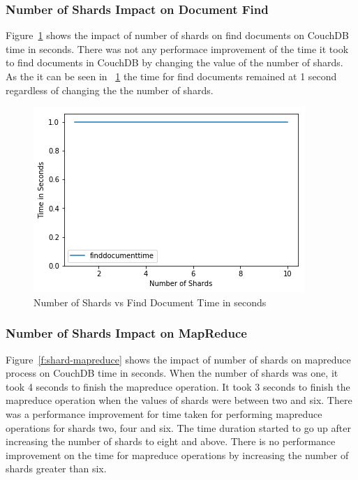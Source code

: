 \subsubsection{Number of Shards Impact on Document Find}


Figure~\ref{f:shard-find} shows the impact of number of shards on find
documents on CouchDB time in seconds. There was not any performace
improvement of the time it took to find documents in CouchDB  by
changing the value of the number of shards. As the it can be seen in
~\ref{f:shard-find} the time for find documents remained at 1 second
regardless of changing the the number of shards.

\begin{figure}[!ht]
  \centering\includegraphics[width=\columnwidth]{../images/ShardsFindDoc.png}
  \caption{Number of Shards vs Find Document Time in seconds }\label{f:shard-find}
\end{figure}

\subsubsection{Number of Shards Impact on MapReduce}


Figure~\ref{f:shard-mapreduce} shows the impact of number of shards on
mapreduce process on CouchDB time in seconds. When the number of shards was one, it took 4 seconds to finish
the mapreduce operation. It took 3 seconds to finish
the mapreduce operation when the values of shards were between two and
six. There was a performance
improvement for time taken for performing mapreduce operations for shards two, four and six.  The time duration started to
go up after increasing the number of shards to eight and above. There
is no performance improvement on the time for mapreduce operations by
increasing the number of shards greater than six.

